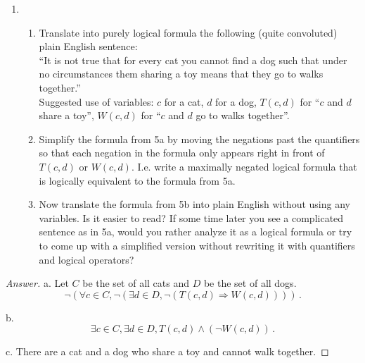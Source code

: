 \documentclass[12pt]{amsart}
\begin{document}
\begin{enumerate}[label=\arabic*.,itemsep=10pt, leftmargin=*]
    \begin{proof}[Answer]
        a. Let $P(x,y)$ be ``$x$ loves $y$'' and $S$ be teh set of all people. 
        Then, $\forall x \in S, \exists y \in S, P(x,y)$.

        b. Let $P(x)$ be ``$x$ is tall and $Q(x)$ be $x$ is short. 
        Then, $\forall x\in S, P(x)\vee Q(x)$.

        c. $(\forall x \in S, P(x) ) \vee (\forall x\in S, Q(x))$.

        d. Let $S$ be the set of all even numbers.
        Let $P(x,n)$ be   ``$x =  2n$''.
        $\forall x\in S, \exists n\in \Z, P(x,n)$.
    \end{proof}



\item  
    \begin{enumerate}[label=\alph*.,itemsep=5pt, leftmargin=*]
    \item
    Translate into purely logical formula the following (quite convoluted) plain English sentence:
    \\
    ``It is not true that for every cat you cannot find a dog such that under no circumstances them sharing a toy means that they go to walks together.''
    \\
    Suggested use of variables: $c$ for a cat, $d$ for a dog, $T(c,d)$ for ``$c$ and $d$ share a toy'', $W(c,d)$ for ``$c$ and $d$ go to walks together''.
    \item 
    Simplify the formula from 5a by moving the negations past the quantifiers so that each negation in the formula only appears right in front of $T(c,d)$ or $W(c,d)$. I.e. write a maximally negated logical formula that is logically equivalent to the formula from 5a.
    \item
    Now translate the formula from 5b into plain English without using any variables. Is it easier to read? If some time later you see a complicated sentence as in 5a, would you rather analyze it as a logical formula or try to come up with a simplified version without rewriting it with quantifiers and logical operators?
    \end{enumerate}
    
   


\end{enumerate}

\begin{proof}[Answer]
    a. 
    Let $C$ be the set of all cats and $D$ be the set of all dogs.
    $$\neg (\forall c\in C, \neg( \exists d\in D, \neg (T(c,d) \Rightarrow W(c,d))))\,.$$ 

    b.
    \begin{equation*}
        \exists c \in C, \exists d\in D, T(c,d)\wedge (\neg W(c,d))\,.
    \end{equation*}

    c. There are a cat and a dog who share a toy and cannot walk together.
\end{proof}
\end{document}
